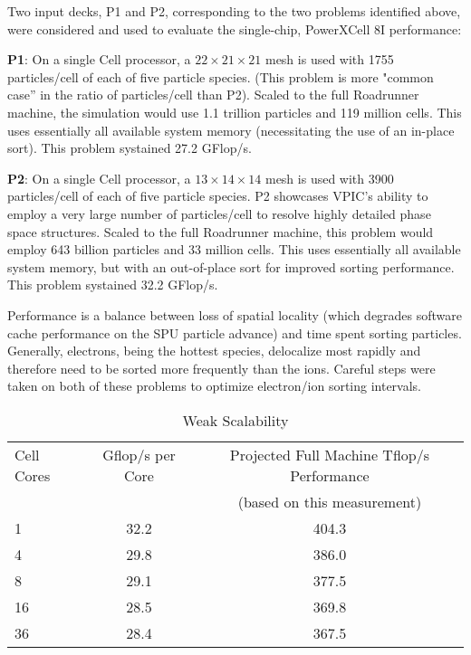 \documentclass[letter,10pt]{article}
\begin{document}
Two input decks,  P1 and P2, corresponding to the two problems 
identified above, were considered and used to evaluate the single-chip, 
PowerXCell 8I performance: 

\textbf{P1}:  On a single Cell processor, a $22 \times 21 \times 21$ mesh 
is used with 1755 particles/cell of each of five particle species.  
(This problem is 
more "common case'' 
in the ratio of particles/cell than P2).  
Scaled to the full Roadrunner machine, the simulation would 
use 1.1 trillion particles and 119 million cells.  This uses essentially
all available system memory (necessitating the use of an in-place sort). 
This problem systained 27.2 GFlop/s. 


\textbf{P2}:  On a single Cell processor, a $13 \times 14 \times 14$ mesh 
is used with 3900 particles/cell of each of five particle species.  
P2 showcases VPIC's ability to employ a very large number of particles/cell 
to resolve highly detailed phase space structures.  
Scaled to the full Roadrunner machine, this problem would employ 
643 billion particles and 33 million cells. This uses essentially
all available system memory, but with an out-of-place sort for improved 
sorting performance. 
This problem systained 32.2 GFlop/s. 

Performance is a balance between loss of spatial locality (which degrades
software cache performance on the SPU particle advance) and time spent
sorting particles.  Generally, electrons, being the hottest species, 
delocalize most rapidly and therefore need to be sorted more
frequently than the ions.  Careful steps were taken on both of these
problems to optimize electron/ion sorting intervals. 

\begin{table}
\caption{\label{tbl:ASDS_Weak_Scalability}
Weak Scalability}

\begin{center}
\begin{tabular}{l c c}
\hline
\hline
Cell Cores & Gflop/s per Core & Projected Full Machine Tflop/s Performance \\
 & & (based on this measurement) \\
\hline
1 & 32.2 & 404.3 \\
4 & 29.8 & 386.0 \\
8 & 29.1 & 377.5 \\
16 & 28.5 & 369.8 \\
36 & 28.4 & 367.5 \\
\hline
\end{tabular}
\end{center}
\end{table}
\end{document}
